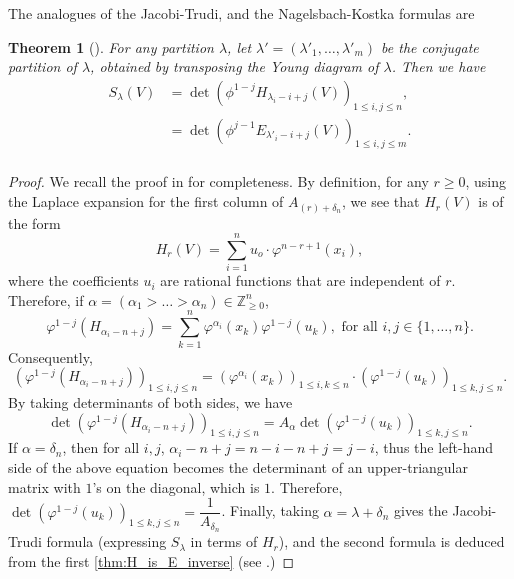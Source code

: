 \documentclass[12pt,a4paper]{report}
\newtheorem{theorem}{Theorem}[chapter]
\theoremstyle{definition}
\theoremstyle{remark}
\theoremstyle{definition}
\begin{document}
The analogues of the Jacobi-Trudi, and the Nagelsbach-Kostka formulas \cite[(0.2), (0.3)]{macdonald_schur_1992} are
\begin{theorem}[{\cite[(7.10)]{macdonald_schur_1992}}]\label{thm:jacobi_trudi}
    For any partition $\lambda$, let $\lambda' = (\lambda'_1, \ldots, \lambda'_m)$ be the \emph{conjugate} partition of $\lambda$, obtained by transposing the Young diagram of $\lambda$. Then we have
    \begin{align*}
        S_{\lambda}(V) &= \det(\phi^{1-j}H_{\lambda_i - i+j}(V))_{1\leq i, j\leq n},\\
        &=\det(\phi^{j-1}E_{\lambda'_i-i+j}(V))_{1\leq i, j\leq m}.\\
    \end{align*}
\end{theorem}
\begin{proof}
    We recall the proof in \cite{macdonald_schur_1992} for completeness. By definition, for any $r\geq 0$, using the Laplace expansion for the first column of $A_{(r)+\delta_n}$, we see that $H_r(V)$ is of the form
    \begin{equation}\label{eq:H_r}
        H_r(V) = \sum\limits_{i=1}^{n}u_o\cdot \varphi^{n-r+1}(x_i),
    \end{equation}
    where the coefficients $u_i$ are rational functions that are independent of $r$. Therefore, if $\alpha = (\alpha_1 > \ldots > \alpha_n)\in \mathbb{Z}_{\geq 0}^n$, 
    \begin{equation*}
        \varphi^{1-j}(H_{\alpha_i-n+j}) = \sum\limits_{k=1}^{n}\varphi^{\alpha_i}(x_k)\varphi^{1-j}(u_k), \text{ for all } i, j\in \{1, \ldots, n\}.
    \end{equation*}
    Consequently,
    \begin{equation*}
        \left(\varphi^{1-j}(H_{\alpha_i-n+j})\right)_{1\leq i, j\leq n} = \left(\varphi^{\alpha_i}(x_k)\right)_{1\leq i, k\leq n}\cdot\left(\varphi^{1-j}(u_k)\right)_{1\leq k, j\leq n}. 
    \end{equation*}
    By taking determinants of both sides, we have
    \begin{equation*}
        \det\left(\varphi^{1-j}(H_{\alpha_i-n+j})\right)_{1\leq i, j\leq n} = A_{\alpha}\det\left(\varphi^{1-j}(u_k)\right)_{1\leq k, j\leq n}.
    \end{equation*}
    If $\alpha = \delta_n$, then for all $i, j$, $\alpha_i -n+j = n-i-n+j = j-i$, thus the left-hand side of the above equation becomes the determinant of an upper-triangular matrix with $1$'s on the diagonal, which is $1$. Therefore, $\det\left(\varphi^{1-j}(u_k)\right)_{1\leq k, j\leq n} = \dfrac{1}{A_{\delta_n}}$. Finally, taking $\alpha = \lambda+\delta_n$ gives the Jacobi-Trudi formula (expressing $S_{\lambda}$ in terms of $H_{r}$), and the second formula is deduced from the first \cref{thm:H_is_E_inverse} (see \cite[Chapter 1, (2.9)]{macdonald_symmetric_1979}.)
\end{proof}
\end{document}
